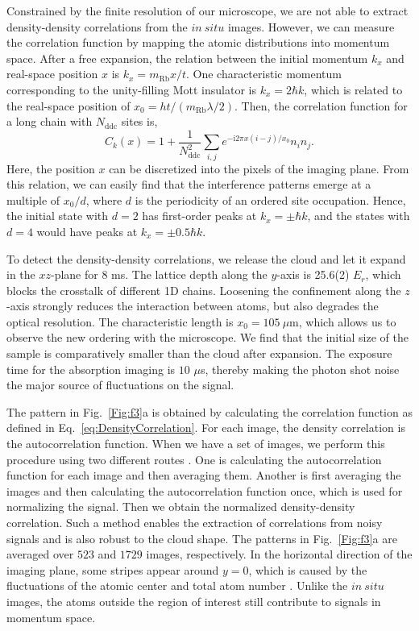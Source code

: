 \documentclass[aps,prl,twocolumn,superscriptaddress,footinbib,linenumbers]{revtex4}
\begin{document}
Constrained by the finite resolution of our microscope, we are not able to extract density-density correlations from the $in\ situ$ images. However, we can measure the correlation function by mapping the atomic distributions into momentum space. After a free expansion, the relation between the initial momentum $k_x$ and real-space position $x$ is $k_x = m_{\text{Rb}} x/t$. One characteristic momentum corresponding to the unity-filling Mott insulator is $k_x=2\hbar k$, which is related to the real-space position of $x_0=ht/(m_{\text{Rb}}\lambda/2)$. Then, the correlation function for a long chain with $N_{\text{ddc}}$ sites is,
\begin{equation}
C_k(x)  = 1 + \frac{1}{N_{\text{ddc}}^2} \sum_{i,j}e^{-\text{i} 2 \pi  x (i-j)/x_0} n_i n_j.
\label{eq:DensityCorrelation}
\end{equation}
Here, the position $x$ can be discretized into the pixels of the imaging plane. From this relation, we can easily find that the interference patterns emerge at a multiple of $x_0/d$, where $d$ is the periodicity of an ordered site occupation. Hence, the initial state with $d=2$ has first-order peaks at $k_x = \pm \hbar k$, and the states with $d=4$ would have peaks at $k_x = \pm 0.5 \hbar k$.

To detect the density-density correlations, we release the cloud and let it expand in the $xz$-plane for $8$ ms. The lattice depth along the $y$-axis is 25.6(2) $E_r$, which blocks the crosstalk of different 1D chains. Loosening the confinement along the $z$-axis strongly reduces the interaction between atoms, but also degrades the optical resolution. The characteristic length is $x_0 = 105\ \mu$m, which allows us to observe the new ordering with the microscope. We find that the initial size of the sample is comparatively smaller than the cloud after expansion. The exposure time for the absorption imaging is $10$ $\mu$s, thereby making the photon shot noise the major source of fluctuations on the signal.

The pattern in Fig.~\ref{Fig:f3}a is obtained by calculating the correlation function as defined in Eq.~\eqref{eq:DensityCorrelation}. For each image, the density correlation is the autocorrelation function. When we have a set of images, we perform this procedure using two different routes \cite{Folling:2005}. One is calculating the autocorrelation function for each image and then averaging them. Another is first averaging the images and then calculating the autocorrelation function once, which is used for normalizing the signal. Then we obtain the normalized density-density correlation. Such a method enables the extraction of correlations from noisy signals and is also robust to the cloud shape. The patterns in Fig.~\ref{Fig:f3}a are averaged over $523$ and $1729$ images, respectively. In the horizontal direction of the imaging plane, some stripes appear around $y=0$, which is caused by the fluctuations of the atomic center and total atom number \cite{Folling:2005}. Unlike the $in \ situ$ images, the atoms outside the region of interest still contribute to signals in momentum space.
\end{document}
